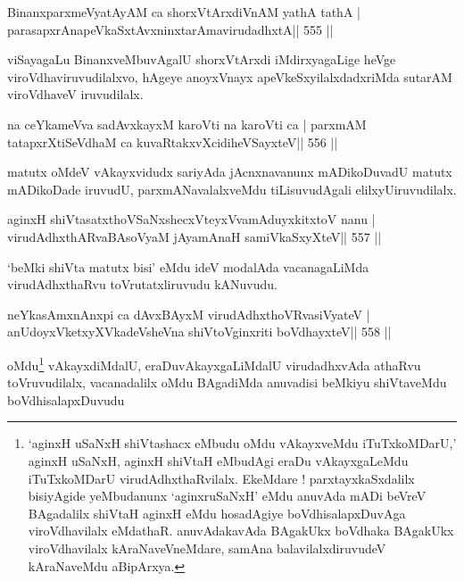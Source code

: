 
\begin{shl}
BinanxparxmeVyatAyAM ca shorxVtArxdiVnAM yathA tathA |
parasapxrAnapeVkaSxtAvxninxtarAmavirudadhxtA\hfill || 555 ||
\end{shl}

\begin{artha}
viSayagaLu BinanxveMbuvAgalU shorxVtArxdi iMdirxyagaLige heVge viroVdhaviruvudilalxvo, hAgeye anoyxVnayx apeVkeSxyilalxdadxriMda sutarAM viroVdhaveV iruvudilalx.
\end{artha}

\begin{shl}
na ceYkameVva sadAvxkayxM karoVti na karoVti ca |
parxmAM tatapxrXtiSeVdhaM ca kuvaRtakxvXcidiheVSayxteV\hfill || 556 ||
\end{shl}

\begin{artha}
matutx oMdeV vAkayxvidudx sariyAda jAcnxnavanunx mADikoDuvadU matutx mADikoDade iruvudU, parxmANavalalxveMdu tiLisuvudAgali elilxyU\break iruvudilalx.
\end{artha}



\begin{shl}
aginxH shiVtasatxthoVSaNxshecxVteyxVvamAduyxkitxtoV nanu |
virudAdhxthARvaBAsoV\s yaM jAyamAnaH samiVkaSxyXteV\hfill || 557 ||
\end{shl}

\begin{artha}
`beMki shiVta matutx bisi' eMdu ideV modalAda vacanagaLiMda
virudAdhxthaRvu toVrutatxliruvudu kANuvudu.

\end{artha}

\begin{shl}
neYkasAmxnAnxpi ca dAvxBAyxM virudAdhxthoVR\s vasiVyateV |
anUdoyxVketxyXVkadeVsheVna shiVtoV\s ginxriti boVdhayxteV\hfill || 558 ||
\end{shl}



\begin{artha}
oMdu\footnote{`aginxH uSaNxH shiVtashacx eMbudu oMdu
vAkayxveMdu iTuTxkoMDarU,' aginxH uSaNxH, aginxH shiVtaH eMbudAgi
eraDu vAkayxgaLeMdu iTuTxkoMDarU virudAdhxthaRvilalx. EkeMdare !
parxtayxkaSxdalilx bisiyAgide yeMbudanunx `aginxruSaNxH' eMdu
anuvAda mADi beVreV BAgadalilx shiVtaH aginxH eMdu hosadAgiye
boVdhisalapxDuvAga viroVdhavilalx eMdathaR. anuvAdakavAda BAgakUkx
boVdhaka BAgakUkx viroVdhavilalx kAraNaveVneMdare,
samAna balavilalxdiruvudeV kAraNaveMdu aBipArxya.} vAkayxdiMdalU, 
eraDu\footnotemark[\thefootnote]
vAkayxgaLiMdalU
virudadhxvAda athaRvu toVruvudilalx, vacanadalilx oMdu BAgadiMda
anuvadisi beMkiyu shiVtaveMdu boVdhisalapxDuvudu
\end{artha}

